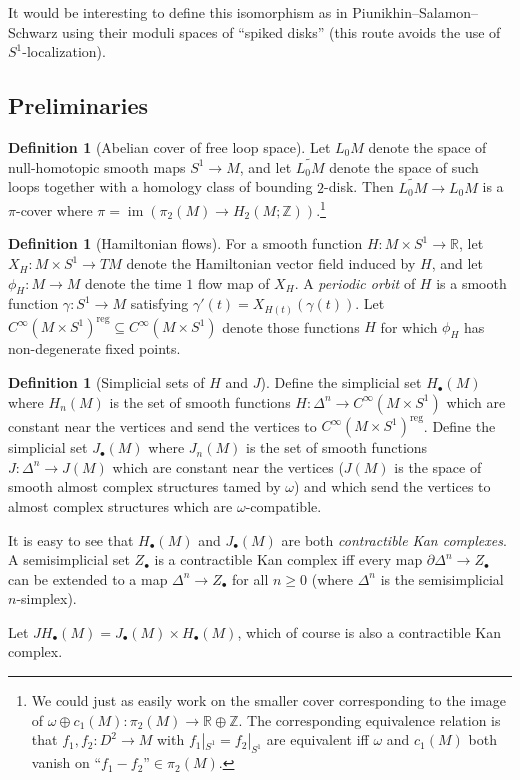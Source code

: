 \documentclass[12pt]{article}
\theoremstyle{definition}
\newtheorem{definition}[theorem]{Definition}
\theoremstyle{remark}
\numberwithin{equation}{subsection}
\newcommand{\ZZ}{\mathbb Z}
\newcommand{\RR}{\mathbb R}
\newcommand{\im}{\operatorname{im}}
\newcommand{\JH}{J\!H}
\newcommand{\reg}{\mathrm{reg}}
\begin{document}
It would be interesting to define this isomorphism as in Piunikhin--Salamon--Schwarz \cite{pss} using their moduli spaces of ``spiked disks'' (this route avoids the use of $S^1$-localization).

\subsection{Preliminaries}

\begin{definition}[Abelian cover of free loop space]
Let $L_0M$ denote the space of null-homotopic smooth maps $S^1\to M$, and let $\widetilde{L_0M}$ denote the space of such loops together with a homology class of bounding $2$-disk.  Then $\widetilde{L_0M}\to L_0M$ is a $\pi$-cover where $\pi=\im(\pi_2(M)\to H_2(M;\ZZ))$.\footnote{We could just as easily work on the smaller cover corresponding to the image of $\omega\oplus c_1(M):\pi_2(M)\to\RR\oplus\ZZ$.  The corresponding equivalence relation is that $f_1,f_2:D^2\to M$ with $f_1|_{S^1}=f_2|_{S^1}$ are equivalent iff $\omega$ and $c_1(M)$ both vanish on ``$f_1-f_2$''$\in\pi_2(M)$.}
\end{definition}

\begin{definition}[Hamiltonian flows]
For a smooth function $H:M\times S^1\to\RR$, let $X_H:M\times S^1\to TM$ denote the Hamiltonian vector field induced by $H$, and let $\phi_H:M\to M$ denote the time $1$ flow map of $X_H$.  A \emph{periodic orbit} of $H$ is a smooth function $\gamma:S^1\to M$ satisfying $\gamma'(t)=X_{H(t)}(\gamma(t))$.  Let $C^\infty(M\times S^1)^\reg\subseteq C^\infty(M\times S^1)$ denote those functions $H$ for which $\phi_H$ has non-degenerate fixed points.
\end{definition}

\begin{definition}[Simplicial sets of $H$ and $J$]\label{JHdef}
Define the simplicial set $H_\bullet(M)$ where $H_n(M)$ is the set of smooth functions $H:\Delta^n\to C^\infty(M\times S^1)$ which are constant near the vertices and send the vertices to $C^\infty(M\times S^1)^\reg$.  Define the simplicial set $J_\bullet(M)$ where $J_n(M)$ is the set of smooth functions $J:\Delta^n\to J(M)$ which are constant near the vertices ($J(M)$ is the space of smooth almost complex structures tamed by $\omega$) and which send the vertices to almost complex structures which are $\omega$-compatible.

It is easy to see that $H_\bullet(M)$ and $J_\bullet(M)$ are both \emph{contractible Kan complexes}.  A semisimplicial set $Z_\bullet$ is a contractible Kan complex iff every map $\partial\Delta^n\to Z_\bullet$ can be extended to a map $\Delta^n\to Z_\bullet$ for all $n\geq 0$ (where $\Delta^n$ is the semisimplicial $n$-simplex).

Let $\JH_\bullet(M)=J_\bullet(M)\times H_\bullet(M)$, which of course is also a contractible Kan complex.
\end{definition}
\end{document}

